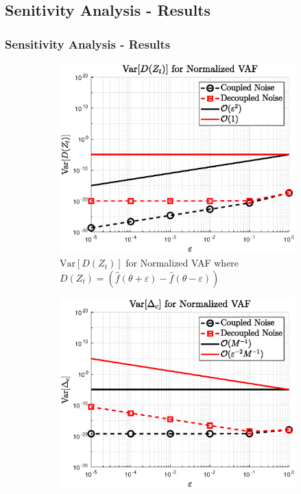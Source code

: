 \documentclass[a4paper,10pt]{beamer}
\newcommand{\sqb}[1]{\left[ #1 \right]}
\newcommand{\rb}[1]{\left( #1 \right)}
\begin{document}
	\begin{frame}
		\subsection{Senitivity Analysis - Results}
		\frametitle{Sensitivity Analysis - Results}
		\begin{figure}[H]
			\begin{subfigure}[b]{0.48\linewidth}
				\includegraphics[width=\linewidth]{./Plots/sensitivityAnalysis/VarianceC1.eps}
				\caption{\scriptsize $\text{Var}\sqb{D\rb{Z_{t}}}$ for Normalized VAF where $D\rb{Z_{t}} = \rb{\hat{f}\rb{\theta + \varepsilon} - \hat{f}\rb{\theta - \varepsilon}}$}
			\end{subfigure}
			\begin{subfigure}[b]{0.48\linewidth}
				\includegraphics[width=\linewidth]{./Plots/sensitivityAnalysis/VarianceC1_CD.eps}

\end{subfigure}
\end{figure}
\end{frame}
\end{document}
